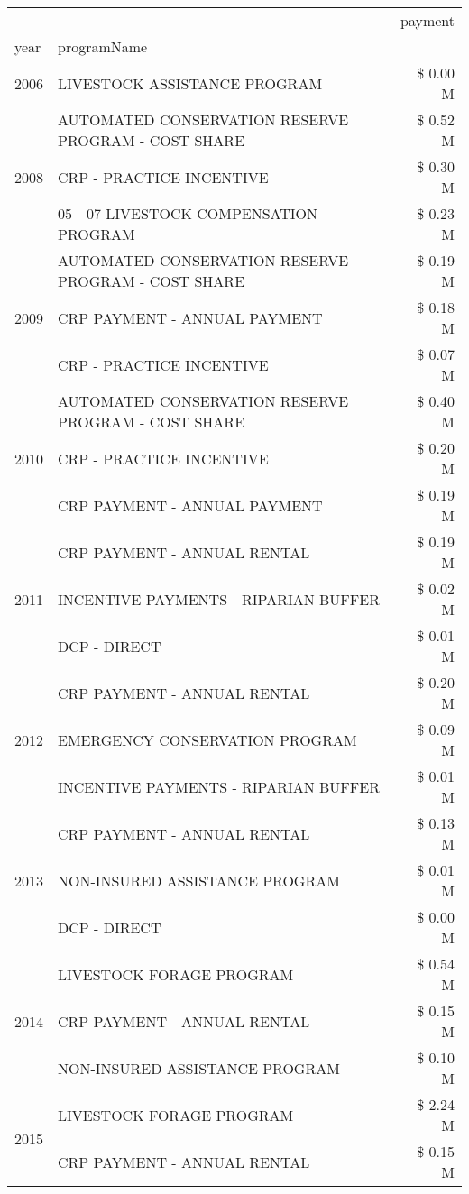 \begin{tabular}{llr}
\toprule
 &  & payment \\
year & programName &  \\
\midrule
2006 & LIVESTOCK ASSISTANCE PROGRAM & \$ 0.00 M \\
\cline{1-3}
\multirow[t]{3}{*}{2008} & AUTOMATED CONSERVATION RESERVE PROGRAM - COST SHARE & \$ 0.52 M \\
 & CRP - PRACTICE INCENTIVE & \$ 0.30 M \\
 & 05 - 07 LIVESTOCK COMPENSATION PROGRAM & \$ 0.23 M \\
\cline{1-3}
\multirow[t]{3}{*}{2009} & AUTOMATED CONSERVATION RESERVE PROGRAM - COST SHARE & \$ 0.19 M \\
 & CRP PAYMENT - ANNUAL PAYMENT & \$ 0.18 M \\
 & CRP - PRACTICE INCENTIVE & \$ 0.07 M \\
\cline{1-3}
\multirow[t]{3}{*}{2010} & AUTOMATED CONSERVATION RESERVE PROGRAM - COST SHARE & \$ 0.40 M \\
 & CRP - PRACTICE INCENTIVE & \$ 0.20 M \\
 & CRP PAYMENT - ANNUAL PAYMENT & \$ 0.19 M \\
\cline{1-3}
\multirow[t]{3}{*}{2011} & CRP PAYMENT - ANNUAL RENTAL & \$ 0.19 M \\
 & INCENTIVE PAYMENTS - RIPARIAN BUFFER & \$ 0.02 M \\
 & DCP - DIRECT & \$ 0.01 M \\
\cline{1-3}
\multirow[t]{3}{*}{2012} & CRP PAYMENT - ANNUAL RENTAL & \$ 0.20 M \\
 & EMERGENCY CONSERVATION PROGRAM & \$ 0.09 M \\
 & INCENTIVE PAYMENTS - RIPARIAN BUFFER & \$ 0.01 M \\
\cline{1-3}
\multirow[t]{3}{*}{2013} & CRP PAYMENT - ANNUAL RENTAL & \$ 0.13 M \\
 & NON-INSURED ASSISTANCE PROGRAM & \$ 0.01 M \\
 & DCP - DIRECT & \$ 0.00 M \\
\cline{1-3}
\multirow[t]{3}{*}{2014} & LIVESTOCK FORAGE PROGRAM & \$ 0.54 M \\
 & CRP PAYMENT - ANNUAL RENTAL & \$ 0.15 M \\
 & NON-INSURED ASSISTANCE PROGRAM & \$ 0.10 M \\
\cline{1-3}
\multirow[t]{3}{*}{2015} & LIVESTOCK FORAGE PROGRAM & \$ 2.24 M \\
 & CRP PAYMENT - ANNUAL RENTAL & \$ 0.15 M \\

\end{tabular}
